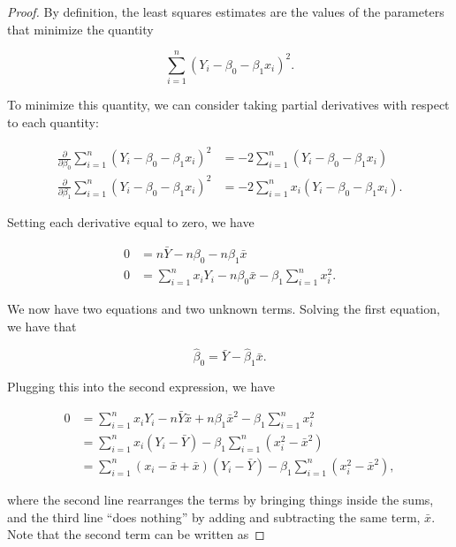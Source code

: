\documentclass[
  letterpaper,
  DIV=11,
  numbers=noendperiod]{scrreprt}
\theoremstyle{plain}
\theoremstyle{definition}
\theoremstyle{definition}
\theoremstyle{remark}
\begin{document}
\begin{proof}

By definition, the least squares estimates are the values of the
parameters that minimize the quantity

\[\sum_{i=1}^{n} \left(Y_i - \beta_0 - \beta_1 x_i\right)^2.\]

To minimize this quantity, we can consider taking partial derivatives
with respect to each quantity:

\[
\begin{aligned}
  \frac{\partial}{\partial \beta_0} \sum_{i=1}^{n} \left(Y_i - \beta_0 - \beta_1 x_i\right)^2
    &= -2 \sum_{i=1}^{n} \left(Y_i - \beta_0 - \beta_1 x_i\right) \\
  \frac{\partial}{\partial \beta_1} \sum_{i=1}^{n} \left(Y_i - \beta_0 - \beta_1 x_i\right)^2
    &= -2 \sum_{i=1}^{n} x_i \left(Y_i - \beta_0 - \beta_1 x_i\right).
\end{aligned}
\]

Setting each derivative equal to zero, we have

\[
\begin{aligned}
  0 
    &= n\bar{Y} - n\beta_0 - n\beta_1 \bar{x} \\
  0
    &= \sum_{i=1}^{n} x_i Y_i - n\beta_0 \bar{x} - \beta_1 \sum_{i=1}^{n} x_i^2. 
\end{aligned}
\]

We now have two equations and two unknown terms. Solving the first
equation, we have that

\[\widehat{\beta}_0 = \bar{Y} - \widehat{\beta}_1 \bar{x}.\]

Plugging this into the second expression, we have

\[
\begin{aligned}
  0 
    &= \sum_{i=1}^{n} x_i Y_i - n\bar{Y}\bar{x} + n \beta_1 \bar{x}^2 - \beta_1 \sum_{i=1}^{n} x_i^2 \\
    &= \sum_{i=1}^{n} x_i \left(Y_i - \bar{Y}\right) - \beta_1 \sum_{i=1}^{n} \left(x_i^2 - \bar{x}^2\right) \\
    &= \sum_{i=1}^{n} \left(x_i - \bar{x} + \bar{x}\right) \left(Y_i - \bar{Y}\right) - \beta_1 \sum_{i=1}^{n} \left(x_i^2 - \bar{x}^2\right),
\end{aligned}
\]

where the second line rearranges the terms by bringing things inside the
sums, and the third line ``does nothing'' by adding and subtracting the
same term, \(\bar{x}\). Note that the second term can be written as


\end{proof}
\end{document}
